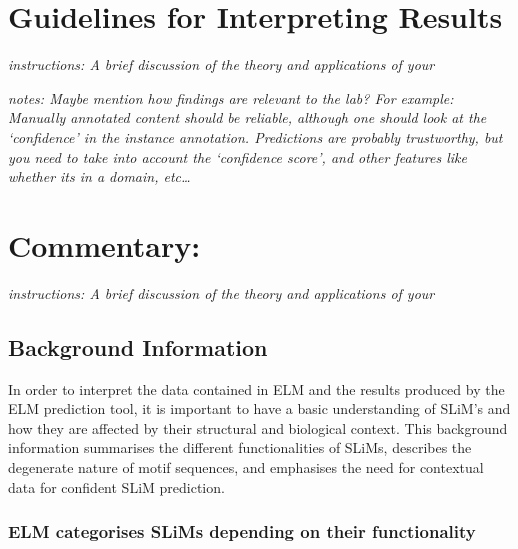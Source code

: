 \section*{Guidelines for Interpreting
Results}\label{guidelines-for-interpreting-results}

\emph{instructions: A brief discussion of the theory and applications of
your}

\emph{notes: Maybe mention how findings are relevant to the lab? For
example: Manually annotated content should be reliable, although one
should look at the `confidence' in the instance annotation. Predictions
are probably trustworthy, but you need to take into account the
`confidence score', and other features like whether its in a domain,
etc\ldots{}}

\section*{Commentary:}\label{commentary}

\emph{instructions: A brief discussion of the theory and applications of
your}

\subsection*{Background Information}\label{background-information}

In order to interpret the data contained in ELM and the results produced by the
ELM prediction tool, it is important to have a basic understanding of SLiM's
and how they are affected by their structural and biological context. This 
background information summarises the different functionalities of SLiMs, 
describes the degenerate nature of motif sequences, and emphasises the need for 
contextual data for confident SLiM prediction.

\subsubsection*{ELM categorises SLiMs depending on their functionality}

